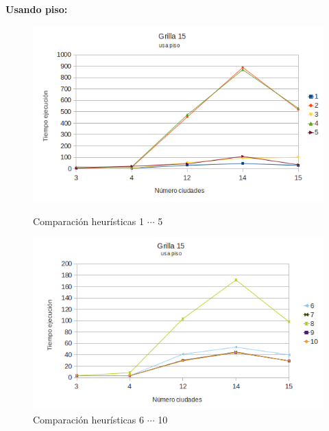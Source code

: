\documentclass[10pt]{article}
\begin{document}
\newpage
\textbf{Usando piso:}

\begin{figure}[ht]

\begin{minipage}[b]{0.45\linewidth}
 \centering
 \includegraphics[width=\textwidth]{grilla15floor0.png}
 \caption{Comparación heurísticas  1 $\cdots$ 5}
 \label{fig:grid15floor0}
\end{minipage}
\hspace{0.5cm}
\begin{minipage}[b]{0.45\linewidth}
 \centering
 \includegraphics[width=\textwidth]{grilla15floor1.png}
 \caption{Comparación heurísticas  6 $\cdots$ 10}
 \label{fig:grid15floor1}
\end{minipage}


\end{figure}
\end{document}
